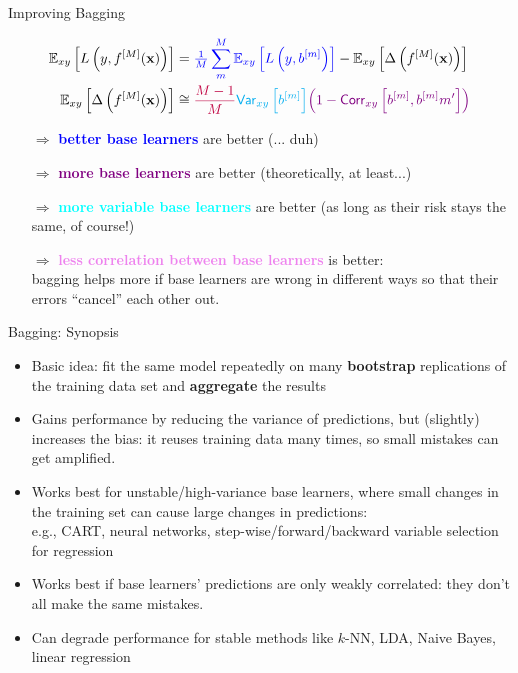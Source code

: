 \documentclass[11pt,compress,t,notes=noshow, xcolor=table]{beamer}
\begin{document}
\begin{vbframe}{Improving Bagging}
\begin{small}
\begin{align*}
\mathbb{E}_{xy}\left[L\left(y, f^{[M]}(\mathbf{x})\right)\right] &= \textcolor{blue}{\tfrac{1}{M}\sum^M_{m} \mathbb{E}_{xy}\left[L\left(y, b^{[m]} \right)\right]} - \mathbb{E}_{xy}\left[\Delta\left(f^{[M]}(\mathbf{x})\right)\right]\\
\mathbb{E}_{xy}\left[\Delta\left(f^{[M]}(\mathbf{x})\right)\right] &\cong 
\textcolor{purple}{\frac{M-1}{M}} \textcolor{cyan}{\mathsf{Var}_{xy}\left[b^{[m]}\right]} \textcolor{violet}{\left(1 - \mathsf{Corr}_{xy}\left[b^{[m]}, b^{[m]}{m'}\right]\right)}
\end{align*}
\end{small}
\begin{itemize}
\item[$\Rightarrow$] \textcolor{blue}{\textbf{better base learners}} are better {\small (... duh)}
\item[$\Rightarrow$] \textcolor{purple}{\textbf{more base learners}} are better {\small (theoretically, at least...)}\\
\item[$\Rightarrow$] \textcolor{cyan}{\textbf{more variable base learners}} are better {\small(as long as their risk stays the same, of course!)}
\item[$\Rightarrow$] \textcolor{violet}{\textbf{less correlation between base learners}} is better:\\ bagging helps more if base learners are wrong in different ways so that their errors \enquote{cancel} each other out.\\
\end{itemize}


\end{vbframe}

\begin{vbframe}{Bagging: Synopsis}

  \begin{itemize}
    \item Basic idea: fit the same model repeatedly on many \textbf{bootstrap} replications of the training data set and \textbf{aggregate} the results
    \item Gains performance by reducing the variance of predictions, but (slightly) increases the bias: it reuses training data many times, so small mistakes can get amplified. 
    \item Works best for unstable/high-variance base learners, where small changes in the training set can cause large changes in predictions:\\
    e.g., CART, neural networks, step-wise/forward/backward variable selection for regression\\
     \item Works best if base learners' predictions are only weakly correlated: they don't all make the same mistakes.
         \item Can degrade performance for stable methods like $k$-NN, LDA, Naive Bayes, linear regression
  \end{itemize}
\end{vbframe}

\endlecture
\end{document}
